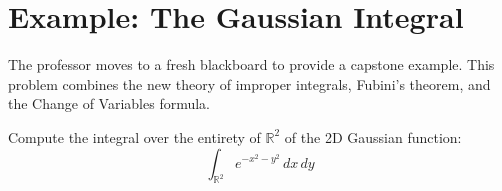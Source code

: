 \section{Example: The Gaussian Integral}

\begin{ai-note}
The professor moves to a fresh blackboard to provide a capstone example. This problem combines the new theory of improper integrals, Fubini's theorem, and the Change of Variables formula.
\end{ai-note}

\begin{exercise}
Compute the integral over the entirety of $\mathbb{R}^2$ of the 2D Gaussian function:
\[
\int_{\mathbb{R}^2} e^{-x^2-y^2} \, dx \, dy
\]
\end{exercise}

